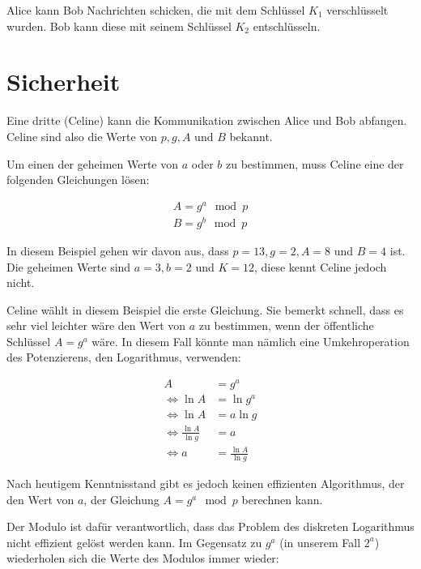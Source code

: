 \documentclass[12pt,twocolumn]{report}
\begin{document}
\begin{flushleft}  
Alice kann Bob Nachrichten schicken, die mit dem Schlüssel $K_1$ verschlüsselt wurden.
Bob kann diese mit seinem Schlüssel $K_2$ entschlüsseln.
\end{flushleft}

\section*{Sicherheit}
\begin{flushleft}
Eine dritte (Celine) kann die Kommunikation zwischen Alice und Bob abfangen.
Celine sind also die Werte von $p,g,A$ und $B$ bekannt.

Um einen der geheimen Werte von $a$ oder $b$ zu bestimmen, muss Celine eine
der folgenden Gleichungen lösen:
\end{flushleft}

\begin{align}
    A=g^a \mod p \\
    B=g^b \mod p
\end{align}

\begin{flushleft}
In diesem Beispiel gehen wir davon aus, dass $p=13,g=2,A=8$ und $B=4$ ist.
Die geheimen Werte sind $a=3,b=2$ und $K=12$, diese kennt Celine jedoch nicht.

Celine wählt in diesem Beispiel die erste Gleichung.
Sie bemerkt schnell, dass es sehr viel leichter wäre den
Wert von $a$ zu bestimmen, wenn der öffentliche Schlüssel $A=g^a$ wäre.
In diesem Fall könnte man nämlich eine Umkehroperation des Potenzierens,
den Logarithmus, verwenden:
\end{flushleft}

\begin{align}
    A&=g^a \\
    \Leftrightarrow \ln{A}&=\ln{g^a} \\
    \Leftrightarrow \ln{A}&=a\ln{g} \\
    \Leftrightarrow \frac{\ln{A}}{\ln{g}}&=a \\
    \Leftrightarrow a&=\frac{\ln{A}}{\ln{g}}
\end{align}

\begin{flushleft}
Nach heutigem Kenntnisstand gibt es jedoch keinen effizienten
Algorithmus, der den Wert von $a$, der Gleichung $A=g^a \mod p$
berechnen kann.
\end{flushleft}

\begin{flushleft}
Der Modulo ist dafür verantwortlich, dass das Problem des diskreten
Logarithmus nicht effizient gelöst werden kann.
Im Gegensatz zu $g^a$ (in unserem Fall $2^a$) wiederholen sich die Werte
des Modulos immer wieder:
\end{flushleft}
\end{document}
